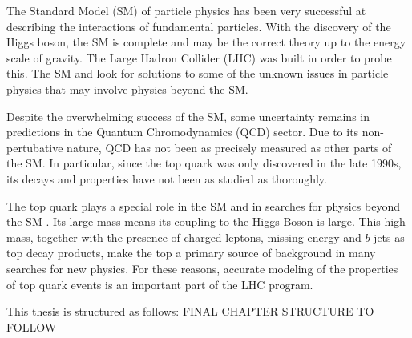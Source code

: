 The Standard Model (SM) of particle physics has been very successful at describing the interactions of fundamental particles. With the discovery of the Higgs boson, the SM is complete and may be the correct theory up to the energy scale of gravity. The Large Hadron Collider (LHC) was built in order to probe this. The SM and look for solutions to some of the unknown issues in particle physics that may involve physics beyond the SM.

Despite the overwhelming success of the SM, some uncertainty remains in predictions in the Quantum Chromodynamics (QCD) sector. Due to its non-pertubative nature, QCD has not been as precisely measured as other parts of the SM. In particular, since the top quark was only discovered in the late 1990s, its decays and properties have not been as studied as thoroughly. 

The top quark plays a special role in the SM and in searches for
physics beyond the SM .  Its large mass means its coupling to the
Higgs Boson is large.  This high mass, together with the presence of 
charged leptons, missing energy and $b$-jets as top decay products,
make the top a primary source of background in many searches for new physics.
For these reasons, accurate modeling of the properties of top quark
events is an important part of the LHC program.

This thesis is structured as follows: FINAL CHAPTER STRUCTURE TO FOLLOW